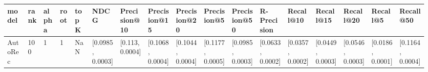 \begin{tabular}{lllllllllllllllll}
\toprule
   model & rank & alpha & root & topK &              NDCG &     Precision@10 &      Precision@15 &      Precision@20 &       Precision@5 &      Precision@50 &       R-Precision &         Recall@10 &         Recall@15 &         Recall@20 &          Recall@5 &         Recall@50 \\
\midrule
 AutoRec &  100 &     1 &    1 &  NaN &  [0.0985, 0.0003] &  [0.113, 0.0004] &  [0.1068, 0.0004] &  [0.1044, 0.0004] &  [0.1177, 0.0005] &  [0.0985, 0.0003] &  [0.0633, 0.0002] &  [0.0357, 0.0002] &  [0.0449, 0.0003] &  [0.0546, 0.0003] &  [0.0186, 0.0001] &  [0.1164, 0.0004] \\
\bottomrule
\end{tabular}
